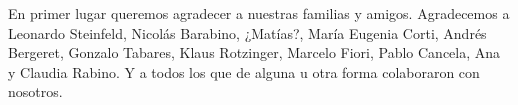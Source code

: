 
\begin{acknowledgments}

En primer lugar queremos agradecer a nuestras familias y amigos. Agradecemos a Leonardo Steinfeld, Nicolás Barabino, ¿Matías?, María Eugenia Corti, Andrés Bergeret, Gonzalo Tabares, Klaus Rotzinger, Marcelo Fiori, Pablo Cancela, Ana y Claudia Rabino. Y a todos los que de alguna u otra forma colaboraron con nosotros.

\end{acknowledgments}